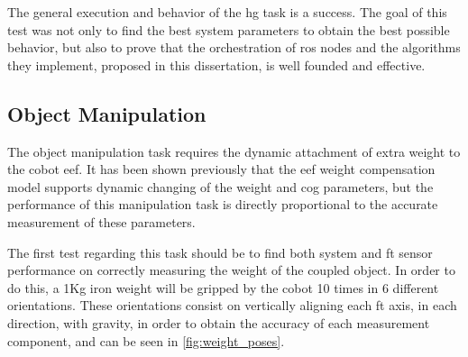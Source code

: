 \par The general execution and behavior of the \ac{hg} task is a success. The goal of this test was not only to find the best system parameters to obtain the best possible behavior, but also to prove that the orchestration of \ac{ros} nodes and the algorithms they implement, proposed in this dissertation, is well founded and effective.



\subsection{Object Manipulation}

\par The object manipulation task requires the dynamic attachment of extra weight to the cobot \ac{eef}. It has been shown previously that the \ac{eef} weight compensation model supports dynamic changing of the weight and \ac{cog} parameters, but the performance of this manipulation task is directly proportional to the accurate measurement of these parameters.

\par The first test regarding this task should be to find both system and \ac{ft} sensor performance on correctly measuring the weight of the coupled object. In order to do this, a 1Kg iron weight will be gripped by the cobot 10 times in 6 different orientations. These orientations consist on vertically aligning each \ac{ft} axis, in each direction, with gravity, in order to obtain the accuracy of each measurement component, and can be seen in \autoref{fig:weight_poses}.

